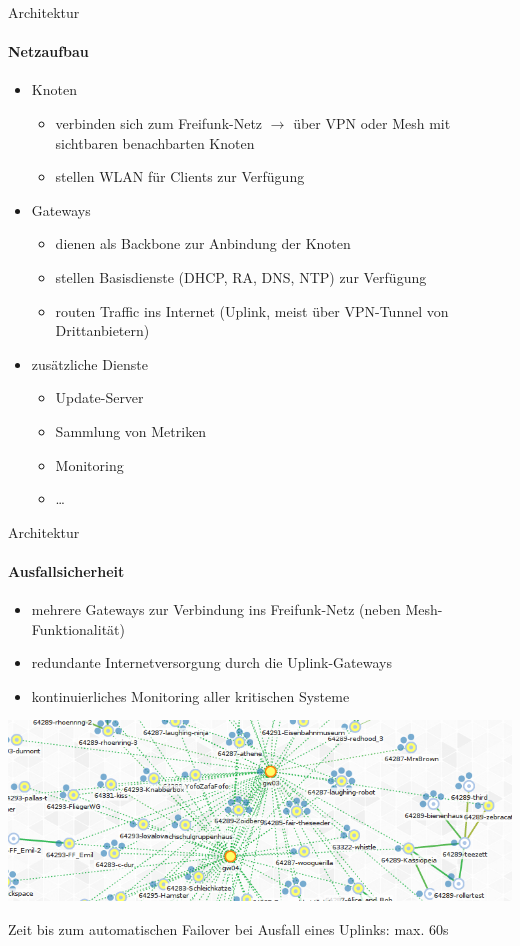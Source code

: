 \documentclass[]{beamer}
\begin{document}
\begin{frame}{Architektur}
\framesubtitle{Netzaufbau}
\begin{itemize}
	\item Knoten \pause
	\begin{itemize}
		\item verbinden sich zum Freifunk-Netz\newline \pause
		$\rightarrow$ über VPN oder Mesh mit sichtbaren benachbarten Knoten \pause
		\item stellen WLAN für Clients zur Verfügung \pause
	\end{itemize}
	\item Gateways \pause
	\begin{itemize}
		\item dienen als Backbone zur Anbindung der Knoten \pause
		\item stellen Basisdienste (DHCP, RA, DNS, NTP) zur Verfügung \pause
		\item routen Traffic ins Internet (Uplink, meist über VPN-Tunnel von Drittanbietern) \pause
	\end{itemize}
	\item zusätzliche Dienste \pause
	\begin{itemize}
		\item Update-Server \pause
		\item Sammlung von Metriken \pause
		\item Monitoring \pause
		\item \ldots
	\end{itemize}
\end{itemize}
\end{frame}

\begin{frame}{Architektur}
\framesubtitle{Ausfallsicherheit}
\vfill
\begin{itemize}
	\item mehrere Gateways zur Verbindung ins Freifunk-Netz (neben Mesh-Funktionalität) \pause
	\item redundante Internetversorgung durch die Uplink-Gateways \pause
	\item kontinuierliches Monitoring aller kritischen Systeme \pause
\end{itemize}
\begin{center}
\includegraphics[width=\textwidth]{images/ffmap_graph} \pause
\end{center}
\vfill
\small{Zeit bis zum automatischen Failover bei Ausfall eines Uplinks: max. 60s}
\vfill
\end{frame}
\end{document}
